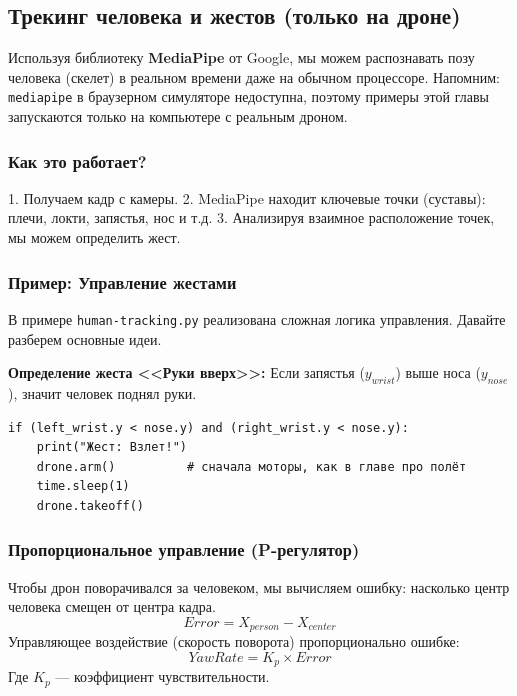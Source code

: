 \subsection{Трекинг человека и жестов (только на дроне)}
\label{sec:human-tracking}

Используя библиотеку \textbf{MediaPipe} от Google, мы можем распознавать позу человека (скелет) в реальном времени даже на обычном процессоре. Напомним: \texttt{mediapipe} в браузерном симуляторе недоступна, поэтому примеры этой главы запускаются только на компьютере с реальным дроном.

\subsubsection*{Как это работает?}
1. Получаем кадр с камеры.
2. MediaPipe находит ключевые точки (суставы): плечи, локти, запястья, нос и т.д.
3. Анализируя взаимное расположение точек, мы можем определить жест.

\subsubsection*{Пример: Управление жестами}
В примере \texttt{human-tracking.py} реализована сложная логика управления. Давайте разберем основные идеи.

\textbf{Определение жеста <<Руки вверх>>:}
Если запястья ($y_{wrist}$) выше носа ($y_{nose}$), значит человек поднял руки.

\begin{codebox}
\begin{verbatim}
if (left_wrist.y < nose.y) and (right_wrist.y < nose.y):
    print("Жест: Взлет!")
    drone.arm()          # сначала моторы, как в главе про полёт
    time.sleep(1)
    drone.takeoff()
\end{verbatim}
\end{codebox}

\subsubsection*{Пропорциональное управление (P-регулятор)}
Чтобы дрон поворачивался за человеком, мы вычисляем ошибку: насколько центр человека смещен от центра кадра.
$$ Error = X_{person} - X_{center} $$
Управляющее воздействие (скорость поворота) пропорционально ошибке:
$$ YawRate = K_p \times Error $$
Где $K_p$ — коэффициент чувствительности.

